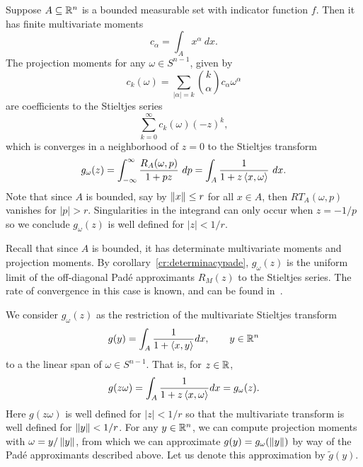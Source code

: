 Suppose $A \subseteq \mathbb{R}^n$ is a bounded measurable set with indicator function $f$. Then it has finite multivariate moments
\[
  c_\alpha = \int_{A} x^{\alpha} ~dx.
\]
The projection moments for any $\omega \in S^{n-1}$, given by
\[
  c_k(\omega) = \sum_{|\alpha| = k} \binom{k}{\alpha} c_\alpha \omega^\alpha
\]
are coefficients to the Stieltjes series
\[
  \sum_{k = 0}^\infty c_k(\omega) (-z)^k,
\]
which is converges in a neighborhood of $z = 0$ to the Stieltjes transform
\[
  g_{\omega}(z) 
  = \int_{-\infty}^\infty \frac{R_A(\omega, p)}{1 + pz} ~dp 
  = \int_{A} \frac1{1 + z\left\langle x, \omega \right\rangle}~dx. 
\]
Note that since $A$ is bounded, say by $\left\| x \right\| \leq r$ for all $x \in A$, then $RT_A(\omega, p)$ vanishes for $|p| > r$. Singularities in the integrand can only occur when $z = -1/p$ so we conclude $g_\omega(z)$ is well defined for $|z| < 1/r$. 

Recall that since $A$ is bounded, it has determinate multivariate moments and projection moments. By corollary~\ref{cr:determinacypade}, $g_{\omega}(z)$ is the uniform limit of the off-diagonal Pad\'e approximants $R_M(z)$ to the Stieltjes series. The rate of convergence in this case is known, and can be found in~\cite{Bake81}.

We consider $g_\omega(z)$ as the restriction of the multivariate Stieltjes transform
\[
  g(y) = \int_{A} \frac{1}{1 + \left\langle x, y \right\rangle} dx, \qquad y \in \mathbb{R}^n
\]
to a the linear span of $\omega \in S^{n-1}$. That is, for $z \in \mathbb{R}$,
\[
  g(z\omega) = \int_{A} \frac{1}{1 + z\left\langle x, \omega \right\rangle} dx = g_\omega(z).
\]
Here $g(z\omega)$ is well defined for $|z| < 1/r$ so that the multivariate transform is well defined for $\left\| y \right\| < 1/r$. For any $y \in \mathbb{R}^n$, we can compute projection moments with $\omega = y/\left\| y \right\|$, from which we can approximate $g(y) = g_\omega(\left\| y \right\|)$ by way of the Pad\'e approximants described above. Let us denote this approximation by $\tilde g(y)$. 

